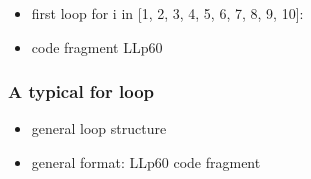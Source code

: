 \documentclass[english,14pt]{beamer}
\begin{document}

\begin{frame}[fragile]

\frametitle{}

\begin{itemize}
	\item first loop for i in [1, 2, 3, 4, 5, 6, 7, 8, 9, 10]:
	\item code fragment LLp60
\end{itemize}


\end{frame}


\begin{frame}[fragile]

\frametitle{A typical for loop}

\begin{itemize}
	\item general loop structure
	\item general format: LLp60 code fragment
\end{itemize}


\end{frame}
\end{document}
